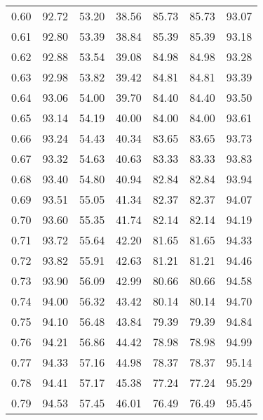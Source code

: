 \begin{tabular}{|c|c|c|c|c|c|c|}
      0.60 &     92.72 &     53.20 &      38.56 &   85.73 &      85.73 &         93.07 \\
      0.61 &     92.80 &     53.39 &      38.84 &   85.39 &      85.39 &         93.18 \\
      0.62 &     92.88 &     53.54 &      39.08 &   84.98 &      84.98 &         93.28 \\
      0.63 &     92.98 &     53.82 &      39.42 &   84.81 &      84.81 &         93.39 \\
      0.64 &     93.06 &     54.00 &      39.70 &   84.40 &      84.40 &         93.50 \\
      0.65 &     93.14 &     54.19 &      40.00 &   84.00 &      84.00 &         93.61 \\
      0.66 &     93.24 &     54.43 &      40.34 &   83.65 &      83.65 &         93.73 \\
      0.67 &     93.32 &     54.63 &      40.63 &   83.33 &      83.33 &         93.83 \\
      0.68 &     93.40 &     54.80 &      40.94 &   82.84 &      82.84 &         93.94 \\
      0.69 &     93.51 &     55.05 &      41.34 &   82.37 &      82.37 &         94.07 \\
      0.70 &     93.60 &     55.35 &      41.74 &   82.14 &      82.14 &         94.19 \\
      0.71 &     93.72 &     55.64 &      42.20 &   81.65 &      81.65 &         94.33 \\
      0.72 &     93.82 &     55.91 &      42.63 &   81.21 &      81.21 &         94.46 \\
      0.73 &     93.90 &     56.09 &      42.99 &   80.66 &      80.66 &         94.58 \\
      0.74 &     94.00 &     56.32 &      43.42 &   80.14 &      80.14 &         94.70 \\
      0.75 &     94.10 &     56.48 &      43.84 &   79.39 &      79.39 &         94.84 \\
      0.76 &     94.21 &     56.86 &      44.42 &   78.98 &      78.98 &         94.99 \\
      0.77 &     94.33 &     57.16 &      44.98 &   78.37 &      78.37 &         95.14 \\
      0.78 &     94.41 &     57.17 &      45.38 &   77.24 &      77.24 &         95.29 \\
      0.79 &     94.53 &     57.45 &      46.01 &   76.49 &      76.49 &         95.45 \\

\end{tabular}
